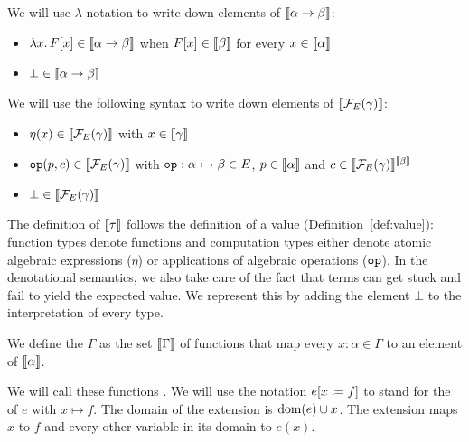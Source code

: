 \begin{notation}
  We will use $\lambda$ notation to write down elements of
  $\llbracket \alpha \to \beta \rrbracket$:
  
  \begin{itemize}
  \item $\lambda x.\, F[x] \in \llbracket \alpha \to \beta \rrbracket$ when
    $F[x] \in \llbracket \beta \rrbracket$ for every $x \in \llbracket \alpha \rrbracket$
  \item $\bot \in \llbracket \alpha \to \beta \rrbracket$
  \end{itemize}

  We will use the following syntax to write down elements of
  $\llbracket \mathcal{F}_E(\gamma) \rrbracket$:
  
  \begin{itemize}
  \item $\eta(x) \in \llbracket \mathcal{F}_E(\gamma) \rrbracket$ with $x \in \llbracket \gamma \rrbracket$
  \item $\mathtt{op}(p,c) \in \llbracket \mathcal{F}_E(\gamma) \rrbracket$ with
    $\mathtt{op} : \alpha \rightarrowtail \beta \in E$, $p \in \llbracket \alpha \rrbracket$ and
    $c \in \llbracket \mathcal{F}_E(\gamma) \rrbracket^{\llbracket \beta \rrbracket}$
  \item $\bot \in \llbracket \mathcal{F}_E(\gamma) \rrbracket$
  \end{itemize}
\end{notation}

The definition of $\llbracket \tau \rrbracket$ follows the definition of a value
(Definition~\ref{def:value}): function types denote functions and
computation types either denote atomic algebraic expressions ($\eta$) or
applications of algebraic operations ($\mathtt{op}$). In the denotational
semantics, we also take care of the fact that terms can get stuck and fail
to yield the expected value. We represent this by adding the element $\bot$
to the interpretation of every type.

\begin{definition}
  We define the  $\Gamma$
  as the set $\llbracket \Gamma \rrbracket$ of functions that map every
  $x : \alpha \in \Gamma$ to an element of $\llbracket \alpha \rrbracket$.
  
  We will call these functions . We will use the notation
  $e[x \coloneqq f]$ to stand for the  of $e$ with
  $x \mapsto f$. The domain of the extension is $\operatorname{dom}(e) \cup x$. The
  extension maps $x$ to $f$ and every other variable in its domain to
  $e(x)$.
\end{definition}

